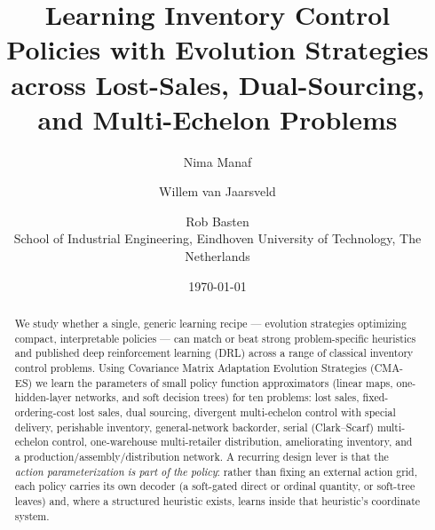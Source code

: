 \documentclass[11pt]{article}
\title{Learning Inventory Control Policies with Evolution Strategies\\[0.35em]
       {\large\normalfont across Lost-Sales, Dual-Sourcing, and Multi-Echelon Problems}}
\author{Nima Manaf \and Willem van Jaarsveld \and Rob Basten\\[0.3em]
        {\small School of Industrial Engineering, Eindhoven University of Technology, The Netherlands}}
\date{\today}
\begin{document}
\maketitle

\begin{abstract}
\noindent
We study whether a single, generic learning recipe --- evolution strategies optimizing compact,
interpretable policies --- can match or beat strong problem-specific heuristics and published deep
reinforcement learning (DRL) across a range of classical inventory control problems. Using
Covariance Matrix Adaptation Evolution Strategies (CMA-ES) we learn the parameters of small policy
function approximators (linear maps, one-hidden-layer networks, and soft decision trees) for ten
problems: lost sales, fixed-ordering-cost lost sales, dual sourcing, divergent multi-echelon control
with special delivery, perishable inventory, general-network backorder, serial (Clark--Scarf)
multi-echelon control, one-warehouse multi-retailer distribution, ameliorating inventory, and a
production/assembly/distribution network. A recurring design lever is that the \emph{action parameterization is
part of the policy}: rather than fixing an external action grid, each policy carries its own decoder
(a soft-gated direct or ordinal quantity, or soft-tree leaves) and, where a structured heuristic
exists, learns inside that heuristic's coordinate system.


\end{abstract}
\end{document}
